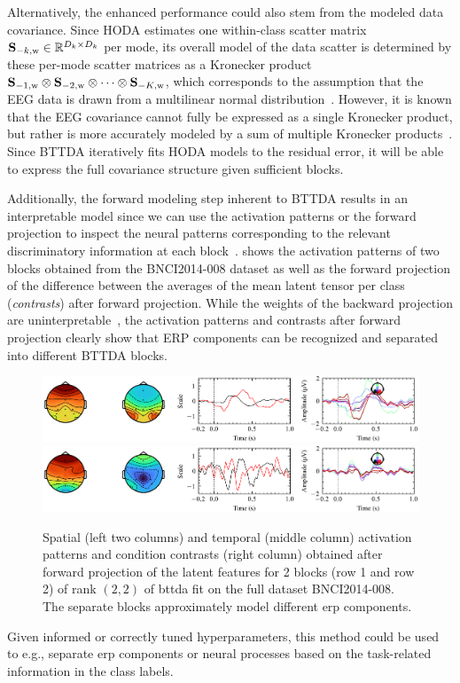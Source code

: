 Alternatively, the enhanced performance could also stem from the modeled data
covariance.
Since HODA estimates one within-class scatter matrix
$\mathbf{S}_{-k,\text{w}}\in\mathbb{R}^{D_k\times D_k}$ per mode, its overall
model of the data scatter is determined by these per-mode scatter matrices as a
Kronecker product $\mathbf{S}_{-1,\text{w}}\otimes
\mathbf{S}_{-2,\text{w}}\otimes\cdots\otimes \mathbf{S}_{-K,\text{w}}$, which corresponds to the assumption that the EEG data is
drawn from a multilinear normal distribution~\cite{Ohlson2013}.
However, it is known that the EEG covariance cannot fully be expressed as a
single Kronecker product, but rather is more accurately modeled by a sum of
multiple Kronecker products~\cite{Bijma2005, Sosulski2022}.
Since BTTDA iteratively fits HODA models to the residual error, it will be able
to express the full covariance structure given sufficient blocks.

Additionally, the forward modeling step inherent to BTTDA results
in an interpretable model since we can use the activation patterns or the
forward projection to inspect the neural patterns corresponding to the
relevant discriminatory information at each block~\cite{Haufe2014}.
 shows the activation patterns
of two blocks obtained from the BNCI2014-008 dataset as well as the forward
projection of the difference between the averages of the mean latent tensor per
class (\emph{contrasts}) after forward projection.
While the weights of the backward projection are
uninterpretable~\cite{Haufe2014},
the activation patterns and contrasts after forward projection clearly show
that ERP components can be recognized and separated into different
BTTDA blocks.
\begin{figure}[t]
	\includegraphics[width=\linewidth]{figures/bttda/forward_block-0.png}
	\includegraphics[width=\linewidth]{figures/bttda/forward_block-1.png}
  \caption[Extracted \acs{bttda} activation patterns.]{%
    Spatial (left two columns) and temporal (middle column) activation patterns and
		condition contrasts (right column) obtained after forward projection of the latent
    features for 2 blocks (row 1 and row 2) of rank $(2,2)$ of \ac{bttda}
    fit on the full dataset BNCI2014-008.
    The separate blocks approximately model different \ac{erp}
		components.}
	\label{fig:forward}
\end{figure}
Given informed or correctly tuned hyperparameters, this method could be used to
e.g., separate \ac{erp} components or neural processes based on the task-related
information in the class labels.


